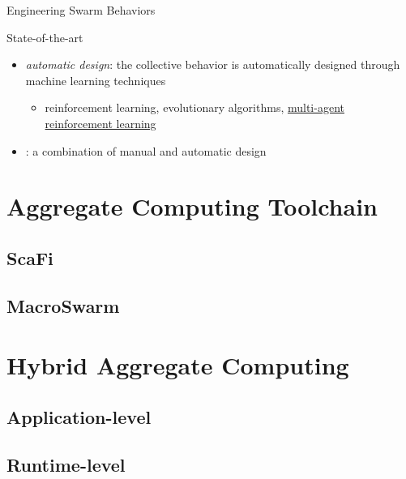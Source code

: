 \documentclass[presentation, 9pt]{beamer}\mode<presentation>{\usetheme{AMSBolognaFC}}
\begin{document}
\begin{frame}[allowframebreaks]{Engineering Swarm Behaviors}
\begin{block}{State-of-the-art}
\begin{itemize}
\begin{itemize}
			\end{itemize}
			\item \emph{automatic design}: the collective behavior is automatically designed through machine learning techniques
			\begin{itemize}
				\item reinforcement learning, evolutionary algorithms, \underline{multi-agent reinforcement learning}
			\end{itemize}
			\item \emph{}: a combination of manual and automatic design
		\end{itemize}
	\end{block}
\end{frame}
\section{Aggregate Computing Toolchain}
\subsection{ScaFi}
\subsection{MacroSwarm}
\section{Hybrid Aggregate Computing}
\subsection{Application-level}
\subsection{Runtime-level}
\end{document}
